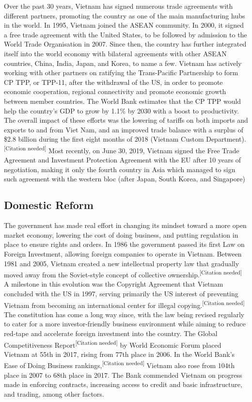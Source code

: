 \documentclass{article}
\begin{document}
Over the past 30 years, Vietnam has signed numerous trade agreements with different partners, promoting the country as one of the main manufacturing hubs in the world. In 1995, Vietnam joined the ASEAN community. In 2000, it signed a free trade agreement with the United States, to be followed by admission to the World Trade Organisation in 2007. Since then, the country has further integrated itself into the world economy with bilateral agreements with other ASEAN countries, China, India, Japan, and Korea, to name a few. Vietnam has actively working with other partners on ratifying the Trans-Pacific Partnership to form CP TPP, or TPP-11, after the withdrawal of the US, in order to promote economic cooperation, regional connectivity and promote economic growth between member countries. The World Bank estimates that the CP TPP would help the country's GDP to grow by 1.1\% by 2030 with a boost to productivity. The overall impact of these efforts was the lowering of tariffs on both imports and exports to and from Viet Nam, and an improved trade balance with a surplus of \$2.8 billion during the first eight months of 2018 (Vietnam Custom Department).\textsuperscript{[Citation needed]} Most recently, on June 30, 2019, Vietnam signed the Free Trade Agreement and Investment Protection Agreement with the EU after 10 years of negotiation, making it only the fourth country in Asia which managed to sign such agreement with the western bloc (after Japan, South Korea, and Singapore)

\subsection*{Domestic Reform}
The government has made real effort in changing its mindset toward a more open market economy, lowering the cost of doing business, and putting regulation in place to ensure rights and orders. In 1986 the government passed its first Law on Foreign Investment, allowing foreign companies to operate in Vietnam. Between 1981 and 2005, Vietnam created a new intellectual property law that gradually moved away from the Soviet-style concept of collective ownership.\textsuperscript{[Citation needed]} A milestone in this evolution was the Copyright Agreement that Vietnam concluded with the US in 1997, serving primarily the US interest of preventing Vietnam from becoming an international center for illegal copying.\textsuperscript{[Citation needed]} The constitution has come a long way since, with the law being revised regularly to cater for a more investor-friendly business environment while aiming to reduce red-tape and accelerate foreign investment into the country. The Global Competitiveness Report\textsuperscript{[Citation needed]} by World Economic Forum placed Vietnam at 55th in 2017, rising from 77th place in 2006. In the World Bank's Ease of Doing Business rankings,\textsuperscript{[Citation needed]} Vietnam also rose from 104th place in 2007 to 68th place in 2017. The Bank commended Vietnam on progress made in enforcing contracts, increasing access to credit and basic infrastructure, and trading, among other factors.
\end{document}
